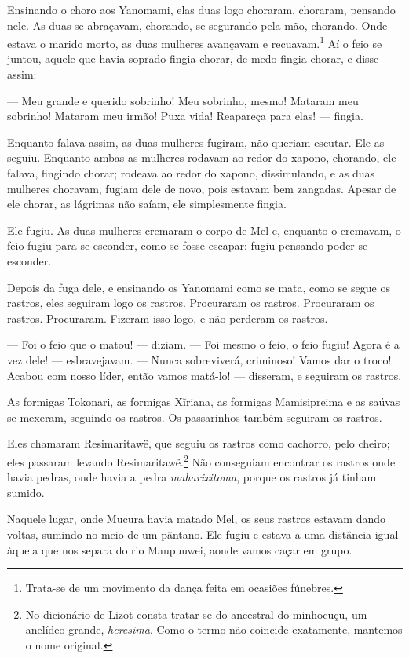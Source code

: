 Ensinando o choro aos Yanomami, elas duas logo choraram, choraram,
pensando nele. As duas se abraçavam, chorando, se segurando pela mão,
chorando. Onde estava o marido morto, as duas mulheres avançavam e
recuavam.\footnote{Trata-se de um movimento da dança feita em ocasiões fúnebres.} Aí o feio se juntou, aquele que havia
soprado fingia chorar, de medo fingia chorar, e disse assim: 

--- Meu grande e querido sobrinho! Meu sobrinho, mesmo! Mataram meu
sobrinho! Mataram meu irmão! Puxa vida! Reapareça para elas! ---
fingia. 

Enquanto falava assim, as duas mulheres fugiram, não queriam escutar.
Ele as seguiu. Enquanto ambas as mulheres rodavam ao redor do xapono,
chorando, ele falava, fingindo chorar; rodeava ao redor do
xapono, dissimulando, e as duas mulheres choravam, fugiam dele de novo,
pois estavam bem zangadas. Apesar de ele chorar, as lágrimas não saíam,
ele simplesmente fingia. 

Ele fugiu. As duas mulheres cremaram o corpo de Mel e, enquanto o
cremavam, o feio fugiu para se esconder, como se fosse escapar: fugiu
pensando poder se esconder. 

Depois da fuga dele, e ensinando os Yanomami como se mata, como se segue os
rastros, eles seguiram logo os rastros. Procuraram os rastros.
Procuraram os rastros. Procuraram. Fizeram isso logo, e não perderam os
rastros. 

--- Foi o feio que o matou! --- diziam. --- Foi mesmo o feio, o feio
fugiu! Agora é a vez dele! --- esbravejavam. --- Nunca sobreviverá,
criminoso! Vamos dar o troco! Acabou com nosso líder, então vamos
matá-lo! --- disseram, e seguiram os rastros. 

As formigas Tokonari, as formigas Xĩriana, as
formigas Mamisipreima e as saúvas se mexeram, seguindo os
rastros. Os passarinhos também seguiram os rastros. 

Eles chamaram {Resimaritawë}, que seguiu os rastros como cachorro,
pelo cheiro; eles passaram levando Resimaritawë.\footnote{No dicionário de Lizot consta tratar-se do ancestral do minhocuçu, um anelídeo grande, \textit{heresima}. Como o termo não coincide exatamente, mantemos o nome original.} Não conseguiam encontrar os rastros onde havia pedras, onde havia a
pedra \textit{maharixitoma}, porque os rastros já tinham sumido. 

Naquele lugar, onde Mucura havia matado Mel, os seus rastros estavam
dando voltas, sumindo no meio de um pântano. Ele fugiu e estava a uma
distância igual àquela que nos separa do rio Maupuuwei, aonde
vamos {caçar em grupo}. 

